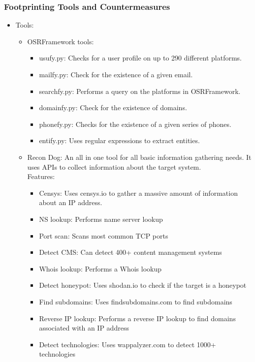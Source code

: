 \subsubsection{Footprinting Tools and Countermeasures}
\begin{itemize}
    \item Tools:
    \begin{itemize}
        \item OSRFramework tools:
        \begin{itemize}
            \item usufy.py: Checks for a user profile on up to 290 different platforms.
            \item mailfy.py: Check for the existence of a given email.
            \item searchfy.py: Performs a query on the platforms in OSRFramework.
            \item domainfy.py: Check for the existence of domains.
            \item phonefy.py: Checks for the existence of a given series of phones.
            \item entify.py: Uses regular expressions to extract entities.
        \end{itemize}
        \item Recon Dog: An all in one tool for all basic information gathering needs. It uses APIs to collect information about the target system.\\
        Features:
        \begin{itemize}
            \item Censys: Uses censys.io to gather a massive amount of information about an IP address.
            \item NS lookup: Performs name server lookup
            \item Port scan: Scans most common TCP ports
            \item Detect CMS: Can detect 400+ content management systems
            \item Whois lookup: Performs a Whois lookup
            \item Detect honeypot: Uses shodan.io to check if the target is a honeypot
            \item  Find subdomains: Uses findsubdomains.com to find subdomains
            \item Reverse IP lookup: Performs a reverse IP lookup to find domains associated with an IP address
            \item Detect technologies: Uses wappalyzer.com to detect 1000+ technologies

\end{itemize}
\end{itemize}
\end{itemize}
